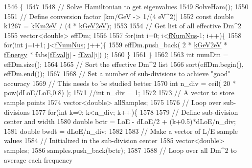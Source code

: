 \begin{DoxyCode}
1546 \{
1547 
1548   \textcolor{comment}{// Solve Hamiltonian to get eigenvalues}
1549   \hyperlink{classOscProb_1_1PMNS__Base_a91f065cb9e910e0095e41462b4420b01}{SolveHam}();
1550 
1551   \textcolor{comment}{// Define conversion factor [km/GeV -> 1/(4 eV^2)]}
1552   \textcolor{keyword}{const} \textcolor{keywordtype}{double} k1267 = \hyperlink{classOscProb_1_1PMNS__Base_a382ddd7b76ca89b43f22614a2ea7327b}{kKm2eV} / (4 * \hyperlink{classOscProb_1_1PMNS__Base_ad36a0a6bf58d6ec093d3947784bd89e9}{kGeV2eV});
1553 
1554   \textcolor{comment}{// Get list of all effective Dm^2}
1555   vector<double> effDm;
1556 
1557   \textcolor{keywordflow}{for}(\textcolor{keywordtype}{int} i=0; i<\hyperlink{classOscProb_1_1PMNS__Base_a24bb74bed63569dfe88b18fa6a08060e}{fNumNus}-1; i++)\{
1558     \textcolor{keywordflow}{for}(\textcolor{keywordtype}{int} j=i+1; j<\hyperlink{classOscProb_1_1PMNS__Base_a24bb74bed63569dfe88b18fa6a08060e}{fNumNus}; j++)\{
1559       effDm.push\_back( 2 * \hyperlink{classOscProb_1_1PMNS__Base_ad36a0a6bf58d6ec093d3947784bd89e9}{kGeV2eV} * \hyperlink{classOscProb_1_1PMNS__Base_a2800af6d436972f3e900867790c046b0}{fEnergy} * fabs(\hyperlink{classOscProb_1_1PMNS__Base_a6319c34d7decbb9d7d6da279c06e8c2d}{fEval}[j] - 
      \hyperlink{classOscProb_1_1PMNS__Base_a6319c34d7decbb9d7d6da279c06e8c2d}{fEval}[i]) );
1560     \}
1561   \}
1562 
1563   \textcolor{keywordtype}{int} numDm = effDm.size();
1564 
1565   \textcolor{comment}{// Sort the effective Dm^2 list}
1566   sort(effDm.begin(), effDm.end());
1567 
1568   \textcolor{comment}{// Set a number of sub-divisions to achieve "good" accuracy}
1569   \textcolor{comment}{// This needs to be studied better}
1570   \textcolor{keywordtype}{int} n\_div = ceil( 20 * pow(dLoE/LoE,0.8) );
1571   \textcolor{comment}{//int n\_div = 1;}
1572 
1573   \textcolor{comment}{// A vector to store sample points}
1574   vector<double> allSamples;
1575 
1576   \textcolor{comment}{// Loop over sub-divisions}
1577   \textcolor{keywordflow}{for}(\textcolor{keywordtype}{int} k=0; k<n\_div; k++)\{
1578 
1579     \textcolor{comment}{// Define sub-division center and width}
1580     \textcolor{keywordtype}{double} bctr = LoE - dLoE/2 + (k+0.5)*dLoE/n\_div;
1581     \textcolor{keywordtype}{double} bwdt = dLoE/n\_div;
1582 
1583     \textcolor{comment}{// Make a vector of L/E sample values}
1584     \textcolor{comment}{// Initialized in the sub-division center}
1585     vector<double> samples;
1586     samples.push\_back(bctr);
1587 
1588     \textcolor{comment}{// Loop over all Dm^2 to average each frequency}

\end{DoxyCode}
